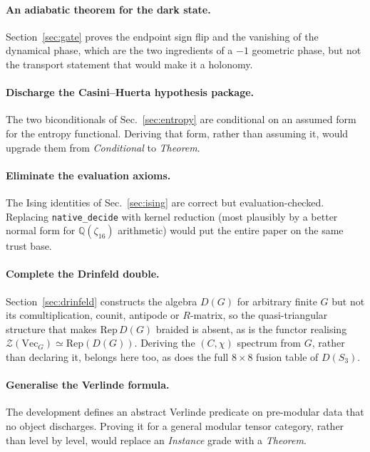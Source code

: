 \documentclass[aps,prx,nofootinbib,superscriptaddress,12pt]{revtex4-2}
\begin{document}
\paragraph{An adiabatic theorem for the dark state.}
Section~\ref{sec:gate} proves the endpoint sign flip and the vanishing
of the dynamical phase, which are the two ingredients of a $-1$ geometric
phase, but not the transport statement that would make it a holonomy.

\paragraph{Discharge the Casini--Huerta hypothesis package.}
The two biconditionals of Sec.~\ref{sec:entropy} are conditional on an
assumed form for the entropy functional. Deriving that form, rather than
assuming it, would upgrade them from \emph{Conditional} to
\emph{Theorem}.

\paragraph{Eliminate the evaluation axioms.}
The Ising identities of Sec.~\ref{sec:ising} are correct but
evaluation-checked. Replacing \texttt{native\_decide} with kernel
reduction (most plausibly by a better normal form for
$\mathbb{Q}(\zeta_{16})$ arithmetic) would put the entire paper on the
same trust base.

\paragraph{Complete the Drinfeld double.}
Section~\ref{sec:drinfeld} constructs the algebra $D(G)$ for arbitrary
finite $G$ but not its comultiplication, counit, antipode or
$R$-matrix, so the quasi-triangular structure that makes
$\mathrm{Rep}\,D(G)$ braided is absent, as is the functor realising
$\mathcal{Z}(\mathrm{Vec}_G) \simeq \mathrm{Rep}(D(G))$. Deriving the
$(C,\chi)$ spectrum from $G$, rather than declaring it, belongs here
too, as does the full $8\times8$ fusion table of $D(S_3)$.

\paragraph{Generalise the Verlinde formula.}
The development defines an abstract Verlinde predicate on pre-modular
data that no object discharges. Proving it for a general modular tensor
category, rather than level by level, would replace an \emph{Instance}
grade with a \emph{Theorem}.
\end{document}
